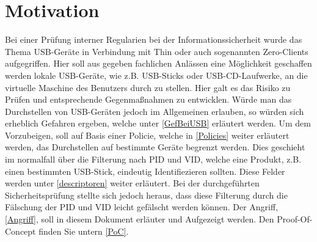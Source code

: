 \documentclass[a4paper,11pt,DIV=11,BROC=5mm,bigheadings,idxtotoc,cleardoubleempty,halfparskip,oneside,openright]{scrreprt} %
\begin{document}
			
						
				\cleardoublepage

			
				\cleardoublepage	
					
			\tableofcontents
				\cleardoublepage	
		
			\printnomenclature
				\cleardoublepage	
			
			\setcounter{page}{1}            
            \cleardoublepage
            
            
                \cleardoublepage
                
			\chapter{Motivation}
Bei einer Prüfung interner Regularien bei der Informationssicherheit wurde das Thema USB-Geräte in Verbindung mit Thin oder auch sogenannten Zero-Clients aufgegriffen. Hier soll aus gegeben fachlichen Anlässen eine Möglichkeit geschaffen werden lokale USB-Geräte, wie z.B. USB-Sticks oder USB-CD-Laufwerke, an die virtuelle Maschine des Benutzers durch zu stellen. Hier galt es das Risiko zu Prüfen und entsprechende Gegenmaßnahmen zu entwicklen. Würde man das Durchstellen von USB-Geräten jedoch im Allgemeinen erlauben, so würden sich erheblich Gefahren ergeben, welche unter \ref{GefBeiUSB} erläutert werden. Um dem Vorzubeigen, soll auf Basis einer Policie, welche in \ref{Policies} weiter erläutert werden, das Durchstellen auf bestimmte Geräte begrenzt werden. Dies geschieht im normalfall über die Filterung nach PID und VID, welche eine Produkt, z.B. einen bestimmten USB-Stick, eindeutig Identifiezieren sollten. Diese Felder werden unter \ref{descriptoren} weiter erläutert. Bei der durchgeführten Sicherheitsprüfung stellte sich jedoch heraus, dass diese Filterung durch die Fälschung der PID und VID leicht gefälscht werden können. Der Angriff, \ref{Angriff}, soll in diesem Dokument erläuter und Aufgezeigt werden. Den Proof-Of-Concept finden Sie untern \ref{PoC}.
\end{document}
